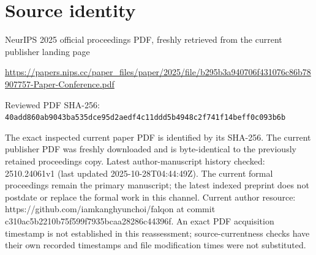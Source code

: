 \documentclass[11pt]{article}
\begin{document}
\section*{Source identity}

NeurIPS 2025 official proceedings PDF, freshly retrieved from the current publisher landing page

\url{https://papers.nips.cc/paper_files/paper/2025/file/b295b3a940706f431076c86b78907757-Paper-Conference.pdf}

Reviewed PDF SHA-256: \nolinkurl{40add860ab9043ba535dce95d2aedf4c11ddd5b4948c2f741f14beff0c093b6b}

The exact inspected current paper PDF is identified by its SHA-256. The current publisher PDF was freshly downloaded and is byte-identical to the previously retained proceedings copy. Latest author-manuscript history checked: 2510.24061v1 (last updated 2025-10-28T04:44:49Z). The current formal proceedings remain the primary manuscript; the latest indexed preprint does not postdate or replace the formal work in this channel. Current author resource: https://github.com/iamkanghyunchoi/falqon at commit c310ac5b2210b75f599f7935bcaa28286c44396f.  An exact PDF acquisition timestamp is not established in this reassessment; source-currentness checks have their own recorded timestamps and file modification times were not substituted.
\end{document}
